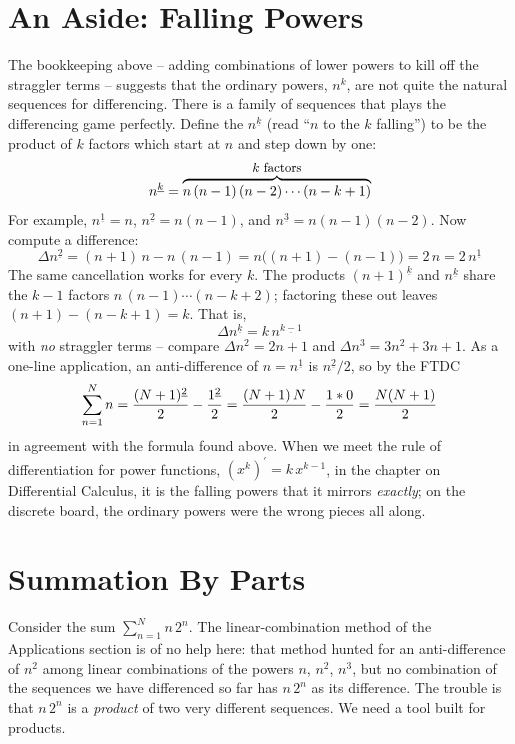\section{An Aside: Falling Powers}
The bookkeeping above -- adding combinations of lower powers to kill off the
straggler terms -- suggests that the ordinary powers, $n^k$, are not quite the
natural sequences for differencing. There is a family of sequences that plays
the differencing game perfectly. Define the {\it {}\/}
$n^{\underline{k}}$ (read ``$n$ to the $k$ falling'') to be the product of $k$
factors which start at $n$ and step down by one:
$$
n^{\underline{k}} = \mathop{\overbrace{n \, (n-1) \, (n-2) \cdots (n - k + 1)}}\limits^{\hbox{\small $k$ factors}}
$$
For example, $n^{\underline{1}} = n$, $n^{\underline{2}} = n(n-1)$, and
$n^{\underline{3}} = n(n-1)(n-2)$. Now compute a difference:
$$
\Delta n^{\underline{2}} = (n+1)\,n - n\,(n-1) = n \bigl( (n+1) - (n-1) \bigr) = 2\, n = 2\, n^{\underline{1}}
$$
The same cancellation works for every $k$. The products $(n+1)^{\underline{k}}$
and $n^{\underline{k}}$ share the $k-1$ factors $n\,(n-1) \cdots (n-k+2)$;
factoring these out leaves $(n+1) - (n-k+1) = k$. That is,
$$
\Delta n^{\underline{k}} = k \, n^{\underline{k-1}}
$$
with {\it no\/} straggler terms -- compare $\Delta n^2 = 2n + 1$ and
$\Delta n^3 = 3n^2 + 3n + 1$. As a one-line application, an anti-difference of
$n = n^{\underline{1}}$ is $n^{\underline{2}}/2$, so by the FTDC
$$
\sum_{n=1}^N n = {(N+1)^{\underline{2}} \over 2} - {1^{\underline{2}} \over 2}
= {(N+1)\,N \over 2} - {1 * 0 \over 2} = {N(N+1) \over 2}
$$
in agreement with the formula found above. When we meet the rule of
differentiation for power functions, $(x^k)^\prime = k\,x^{k-1}$, in the
chapter on Differential Calculus, it is the falling powers that it mirrors
{\it exactly\/}; on the discrete board, the ordinary powers were the wrong
pieces all along.


\section{Summation By Parts}
Consider the sum $\sum_{n=1}^{N} n \, 2^n$. The linear-combination method
of the Applications section is of no help here: that method hunted for an anti-difference of $n^2$
among linear combinations of the powers $n$, $n^2$, $n^3$, but no
combination of the sequences we have differenced so far has $n \, 2^n$ as
its difference. The trouble is that $n \, 2^n$ is a {\it product\/} of two
very different sequences. We need a tool built for products.

